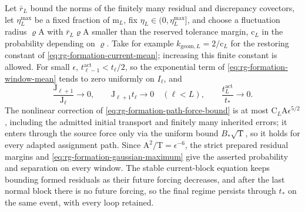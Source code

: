 Let \(\bar r_L\) bound the norms of the finitely many residual and discrepancy
covectors, let \(\eta_L^{\max}\) be a fixed fraction of \(\mathrm m_L\), fix
\(\eta_L\in(0,\eta_L^{\max}]\), and choose a fluctuation radius
\(\varrho\mathrm A\) with \(\bar r_L\varrho\mathrm A\) smaller than the reserved
tolerance margin, \(\mathrm c_L\) in the probability depending on \(\varrho\).
Take for example \(k_{\mathrm{geom},L}=2/\mathrm c_L\) for the restoring constant
of \cref{eq:rg-formation-current-mean}; increasing this finite constant is
allowed. For small \(\epsilon\), \(t^{\mathrm{act}}_{\ell-1}<t_\ell/2\), so the
exponential term of \cref{eq:rg-formation-window-mean} tends to zero uniformly
on \(I_\ell\), and
\begin{equation}
 \frac{\mathrm J_{\ell+1}}{\mathrm J_\ell}\longrightarrow0,
 \qquad \mathrm J_{\ell+1}t_\ell\longrightarrow0\quad(\ell<L),
 \qquad \frac{t^{\mathrm{act}}_L}{t_*}\longrightarrow0.
 \label{eq:rg-formation-geometric-entrance}
\end{equation}
The nonlinear correction of \cref{eq:rg-formation-path-force-bound} is at most
\(\mathrm C_L\mathrm A\epsilon^{5/2}\), including the admitted initial transport
and finitely many inherited errors; it enters through the source force only via
the uniform bound \(B_*\sqrt{\mathrm T}\), so it holds for every adapted
assignment path. Since \(\mathrm A^2/\mathrm T=\epsilon^{-6}\), the strict
prepared residual margins and \cref{eq:rg-formation-gaussian-maximum} give the
asserted probability and separation on every window. The stable current-block
equation keeps bounding formed residuals as their future forcing decreases,
and after the last normal block there is no future forcing, so the final
regime persists through \(t_*\) on the same event, with every loop retained.

